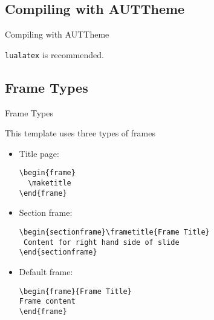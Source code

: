 \documentclass[aspectratio=169, 12pt]{beamer}    %
\begin{document}
\subsection{Compiling with AUTTheme}
\begin{frame}[fragile = singleslide]{Compiling with AUTTheme}
 
\verb|lualatex| is recommended.

\end{frame}



\subsection{Frame Types}
\begin{frame}[fragile = singleslide]{Frame Types}

This template uses three types of frames
\begin{itemize}
 \item \alert{Title page:}
 \begin{verbatim}
\begin{frame}
  \maketitle 
\end{frame}
\end{verbatim}
 
 \item \alert{Section frame:}
 \begin{verbatim}
\begin{sectionframe}\frametitle{Frame Title}
 Content for right hand side of slide
\end{sectionframe}
\end{verbatim}

\item \alert{Default frame:}
\begin{verbatim}
\begin{frame}{Frame Title}
Frame content
\end{frame}
\end{verbatim}

\end{itemize}
\end{frame}


\end{document}
